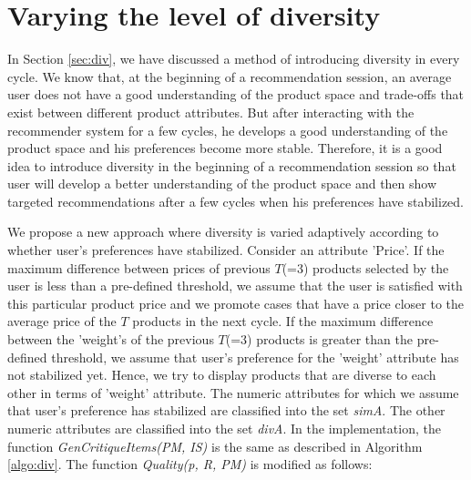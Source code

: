 \section{Varying the level of diversity}
\label{sec:div2}
In Section \ref{sec:div}, we have discussed a method of introducing diversity in every cycle.
We know that, at the beginning of a recommendation session, an average user does not have a good understanding of the product space and trade-offs that exist between different product attributes.
But after interacting with the recommender system for a few cycles, he develops a good understanding of the product space and his preferences become more stable.
Therefore, it is a good idea to introduce diversity in the beginning of a recommendation session so that user will develop a better understanding of the product space and then show targeted recommendations after a few cycles when his preferences have stabilized.

We propose a new approach where diversity is varied adaptively according to whether user's preferences have stabilized.
Consider an attribute 'Price'.
If the maximum difference between prices of previous $T$(=3) products selected by the user is less than a pre-defined threshold, we assume that the user is satisfied with this particular product price and we promote cases that have a price closer to the average price of the $T$ products in the next cycle.
If the maximum difference between the 'weight's of the previous $T$(=3) products is greater than the pre-defined threshold, we assume that user's preference for the 'weight' attribute has not stabilized yet. 
Hence, we try to display products that are diverse to each other in terms of 'weight' attribute.
The numeric attributes for which we assume that user's preference has stabilized are classified into the set \textit{simA}.
The other numeric attributes are classified into the set \textit{divA}.
In the implementation, the function \textit{GenCritiqueItems(PM, IS)} is the same as described in Algorithm \ref{algo:div}.
The function \textit{Quality(p, R, PM)} is modified as follows:

